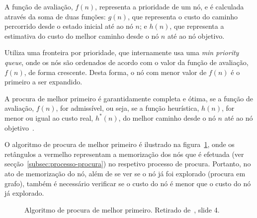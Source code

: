 A função de avaliação, $f(n)$, representa a prioridade de um nó, e é calculada através da soma de duas funções: $g(n)$, que representa o custo do caminho percorrido desde o estado inicial até ao nó $n$; e $h(n)$, que representa a estimativa do custo do melhor caminho desde o nó $n$ até ao nó objetivo.

Utiliza uma fronteira por prioridade, que internamente usa uma \textit{min priority queue}, onde os nós são ordenados de acordo com o valor da função de avaliação, $f(n)$, de forma crescente.
Desta forma, o nó com menor valor de $f(n)$ é o primeiro a ser expandido.

A procura de melhor primeiro é garantidamente completa e ótima, se a função de avaliação, $f(n)$, for admissível, ou seja, se a função heurística, $h(n)$, for menor ou igual ao custo real, $h^*(n)$, do melhor caminho desde o nó $n$ até ao nó objetivo~\cite{ist:leic:resumos:procura-cega}.

O algoritmo de procura de melhor primeiro é ilustrado na figura~\ref{fig:alg-proc-melh-prim}, onde os retângulos a vermelho representam a memorização dos nós que é efetuada (ver secção~\ref{subsec:processo-procura}) no respetivo processo de procura.
Portanto, no ato de memorização do nó, além de se ver se o nó já foi explorado (procura em grafo), também é necessário verificar se o custo do nó é menor que o custo do nó já explorado.

\begin{figure}[H]
    \begin{center}
    \end{center}
    \caption{Algoritmo de procura de melhor primeiro. Retirado de~\cite{isel:iasa:slides:proc-espaco-estados-parte-2}, slide 4.}
    \label{fig:alg-proc-melh-prim}
\end{figure}

